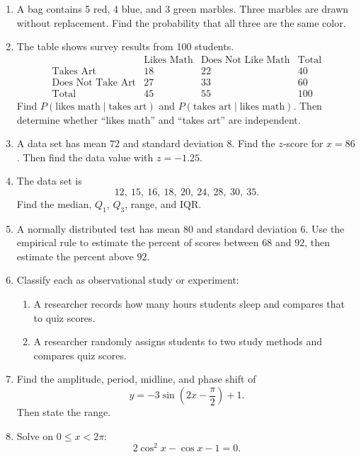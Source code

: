 \documentclass[12pt]{article}
\begin{document}
\begin{enumerate}[leftmargin=*, itemsep=1em, topsep=0.8em]
  \item A bag contains 5 red, 4 blue, and 3 green marbles. Three marbles are drawn without replacement. Find the probability that all three are the same color.

  \item The table shows survey results from 100 students.
  \[
  \begin{array}{c|ccc}
   & \text{Likes Math} & \text{Does Not Like Math} & \text{Total}\\ \hline
  \text{Takes Art} & 18 & 22 & 40\\
  \text{Does Not Take Art} & 27 & 33 & 60\\ \hline
  \text{Total} & 45 & 55 & 100
  \end{array}
  \]
  Find $P(\text{likes math}\mid \text{takes art})$ and $P(\text{takes art}\mid \text{likes math})$. Then determine whether ``likes math'' and ``takes art'' are independent.

  \item A data set has mean $72$ and standard deviation $8$. Find the $z$-score for $x=86$. Then find the data value with $z=-1.25$.

  \item The data set is
  \[
  12,\ 15,\ 16,\ 18,\ 20,\ 24,\ 28,\ 30,\ 35.
  \]
  Find the median, $Q_1$, $Q_3$, range, and IQR.

  \item A normally distributed test has mean $80$ and standard deviation $6$. Use the empirical rule to estimate the percent of scores between $68$ and $92$, then estimate the percent above $92$.

  \item Classify each as observational study or experiment:
  \begin{enumerate}[label=(\alph*)]
    \item A researcher records how many hours students sleep and compares that to quiz scores.
    \item A researcher randomly assigns students to two study methods and compares quiz scores.
  \end{enumerate}

  \item Find the amplitude, period, midline, and phase shift of
  \[
  y=-3\sin\left(2x-\frac{\pi}{2}\right)+1.
  \]
  Then state the range.

  \item Solve on $0\le x<2\pi$:
  \[
  2\cos^2 x-\cos x-1=0.
  \]
\end{enumerate}
\end{document}
